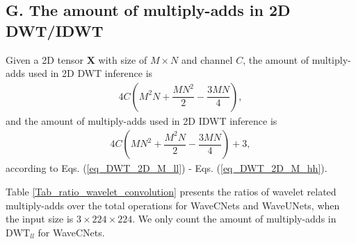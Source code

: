 \subsection*{G. The amount of multiply-adds in 2D DWT/IDWT}
Given a 2D tensor $\textbf{X}$ with size of $M\times N$ and channel $C$,
the amount of multiply-adds used in 2D DWT inference is
\begin{align}
\label{eq_no_2D_DWT}
4C\left(M^2N+\dfrac{MN^2}{2} - \dfrac{3MN}{4}\right),
\end{align}
and the amount of multiply-adds used in 2D IDWT inference is
\begin{align}
\label{eq_no_2D_IDWT}
4C\left(MN^2+\dfrac{M^2N}{2} - \dfrac{3MN}{4}\right) + 3,
\end{align}
according to Eqs. (\ref{eq_DWT_2D_M_ll}) - Eqs. (\ref{eq_DWT_2D_M_hh}).

Table \ref{Tab_ratio_wavelet_convolution} presents
the ratios of wavelet related multiply-adds over the total operations for WaveCNets and WaveUNets,
when the input size is $3\times224\times224$.
We only count the amount of multiply-adds in $\text{DWT}_{ll}$ for WaveCNets.
\begin{table}
\scriptsize
\caption{Wavelet related operation ratios.}
\label{Tab_ratio_wavelet_convolution}
\begin{center}
\end{center}
\end{table}
